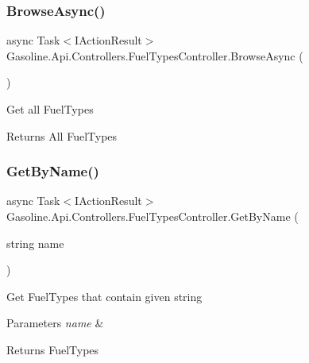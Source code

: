 \subsubsection{\texorpdfstring{BrowseAsync()}{BrowseAsync()}}
{\footnotesize\ttfamily async Task$<$I\+Action\+Result$>$ Gasoline.\+Api.\+Controllers.\+Fuel\+Types\+Controller.\+Browse\+Async (\begin{DoxyParamCaption}{ }\end{DoxyParamCaption})}



Get all Fuel\+Types 

\begin{DoxyReturn}{Returns}
All Fuel\+Types
\end{DoxyReturn}
\mbox{\label{class_gasoline_1_1_api_1_1_controllers_1_1_fuel_types_controller_ae064a5c08e3ebf4f845e95f56ba06ea8}} 
\subsubsection{\texorpdfstring{GetByName()}{GetByName()}}
{\footnotesize\ttfamily async Task$<$I\+Action\+Result$>$ Gasoline.\+Api.\+Controllers.\+Fuel\+Types\+Controller.\+Get\+By\+Name (\begin{DoxyParamCaption}\item[{string}]{name }\end{DoxyParamCaption})}



Get Fuel\+Types that contain given string 


\begin{DoxyParams}{Parameters}
{\em name} & \\
\hline
\end{DoxyParams}
\begin{DoxyReturn}{Returns}
Fuel\+Types
\end{DoxyReturn}
\mbox{\label{class_gasoline_1_1_api_1_1_controllers_1_1_fuel_types_controller_a370af0dd01c9bd075e4c3cb5c4affb6b}} 
